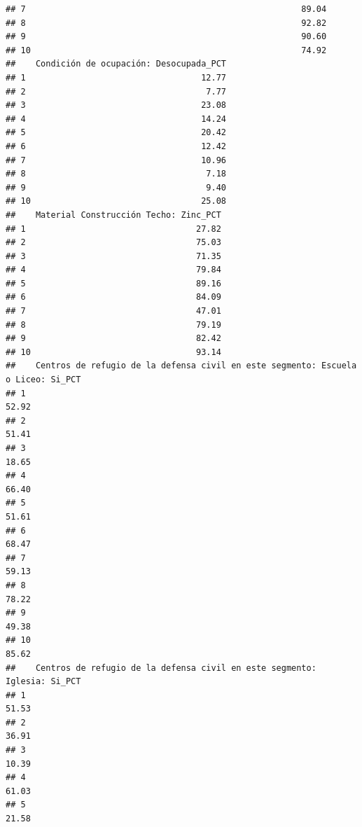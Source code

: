 \documentclass[11pt,]{article}
\begin{document}
\begin{verbatim}
## 7                                                       89.04
## 8                                                       92.82
## 9                                                       90.60
## 10                                                      74.92
##    Condición de ocupación: Desocupada_PCT
## 1                                   12.77
## 2                                    7.77
## 3                                   23.08
## 4                                   14.24
## 5                                   20.42
## 6                                   12.42
## 7                                   10.96
## 8                                    7.18
## 9                                    9.40
## 10                                  25.08
##    Material Construcción Techo: Zinc_PCT
## 1                                  27.82
## 2                                  75.03
## 3                                  71.35
## 4                                  79.84
## 5                                  89.16
## 6                                  84.09
## 7                                  47.01
## 8                                  79.19
## 9                                  82.42
## 10                                 93.14
##    Centros de refugio de la defensa civil en este segmento: Escuela o Liceo: Si_PCT
## 1                                                                             52.92
## 2                                                                             51.41
## 3                                                                             18.65
## 4                                                                             66.40
## 5                                                                             51.61
## 6                                                                             68.47
## 7                                                                             59.13
## 8                                                                             78.22
## 9                                                                             49.38
## 10                                                                            85.62
##    Centros de refugio de la defensa civil en este segmento: Iglesia: Si_PCT
## 1                                                                     51.53
## 2                                                                     36.91
## 3                                                                     10.39
## 4                                                                     61.03
## 5                                                                     21.58

\end{verbatim}
\end{document}
